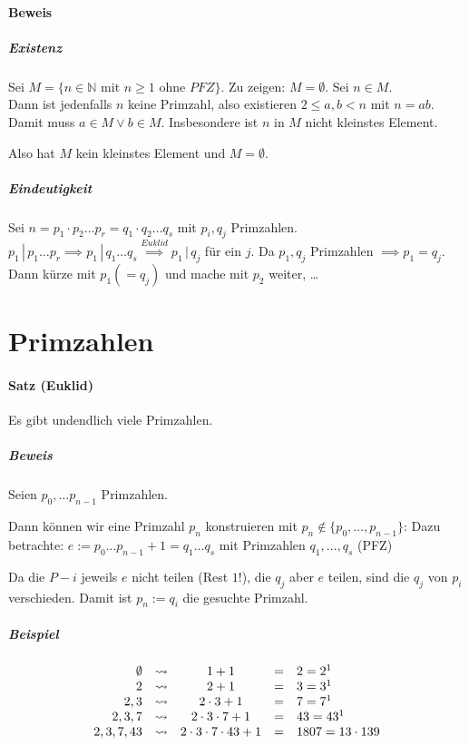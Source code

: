 \documentclass[14pt,a4paper]{article}
\newcommand{\N}{\ensuremath{\mathbb{N}}}
\begin{document}
   		   \paragraph{Beweis}
   			   \subparagraph{Existenz}
   				   Sei $ M = \{ n \in \N \text{ mit } n \ge 1 \text{ ohne } PFZ \} $. Zu zeigen: $ M = \emptyset $.
   				   Sei $ n \in M $.\\
   				   Dann ist jedenfalls $n$ keine Primzahl, also existieren $ 2 \le a,b < n $ mit $ n = ab $.
   				   Damit muss $ a \in M \lor b \in M $.
   				   Insbesondere ist $ n $ in $ M $ nicht kleinstes Element.

   				   Also hat $ M $ kein kleinstes Element und $ M = \emptyset $.

   			   \subparagraph{Eindeutigkeit}
   				   Sei $ n = p_1 \cdot p_2 \dots p_r = q_1 \cdot q_2 \dots q_s $ mit $p_i, q_j $ Primzahlen.\\
   				   $ p_1 \, | \, p_1 \dots p_r \implies p_1 \, | \, q_1 \dots q_s \stackrel{Euklid}{\implies} p_1 \, | \, q_j $ für ein $ j $. Da $p_1, q_j$ Primzahlen $\implies p_1 = q_j$.
   				   Dann kürze mit $ p_1 ( = q_j ) $ und mache mit $ p_2 $ weiter, …


	\setcounter{section}{5}
    \section{Primzahlen}
    \paragraph{Satz (Euklid)}
    Es gibt undendlich viele Primzahlen.

    \subparagraph{Beweis}
    Seien $ p_0, \dots p_{n-1} $ Primzahlen.

    Dann können wir eine Primzahl $p_n$
    konstruieren mit $p_n \notin \{p_0, \dots, p_{n-1}\}$:
    Dazu betrachte: $ e := p_0 \dots p_{n-1} + 1 = q_1 \dots q_s $ mit
    Primzahlen $ q_1, \dots, q_s$ (PFZ)


    Da die $P-i$ jeweils $e$ nicht teilen (Rest $1$!), die $q_j$ aber $e$ teilen,
    sind die $q_j$ von $p_i$ verschieden.
    Damit ist $p_n := q_i$ die gesuchte Primzahl.

    \subparagraph{Beispiel}
    $$
    \begin{array}{r c c c l}
      \emptyset & \rightsquigarrow & 1 + 1 & = & 2 = 2^1  \\
    {2} & \rightsquigarrow & 2 + 1 & = & 3 = 3^1 \\
    {2,3} & \rightsquigarrow & 2 \cdot 3 + 1 & = & 7 = 7^1 \\
    {2,3,7} & \rightsquigarrow & 2 \cdot 3 \cdot 7 + 1 & = & 43 = 43^1 \\
    {2, 3,7,43} & \rightsquigarrow & 2 \cdot 3 \cdot 7 \cdot 43 + 1 & = & 1807 = 13 \cdot
      139 \\
    \end{array}
    $$
\end{document}
